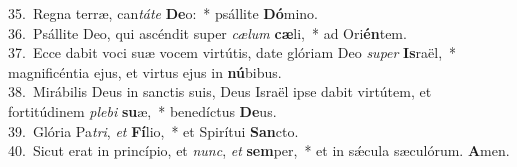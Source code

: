{35.~}Regna terræ, can\textit{tá}\textit{te} \textbf{De}o:~* psállite \textbf{Dó}mino.\\
{36.~}Psállite Deo, qui ascéndit super \textit{cæ}\textit{lum} \textbf{cæ}li,~* ad Ori\textbf{én}tem.\\
{37.~}Ecce dabit voci suæ vocem virtútis, date glóriam Deo \textit{su}\textit{per} \textbf{Is}raël,~* magnificéntia ejus, et virtus ejus in \textbf{nú}bibus.\\
{38.~}Mirábilis Deus in sanctis suis, Deus Israël ipse dabit virtútem, et fortitúdinem \textit{ple}\textit{bi} \textbf{su}æ,~* benedíctus \textbf{De}us.\\
{39.~}Glória Pa\textit{tri}, \textit{et} \textbf{Fí}lio,~* et Spirítui \textbf{San}cto.\\
{40.~}Sicut erat in princípio, et \textit{nunc}, \textit{et} \textbf{sem}per,~* et in sǽcula sæculórum. \textbf{A}men.\\
